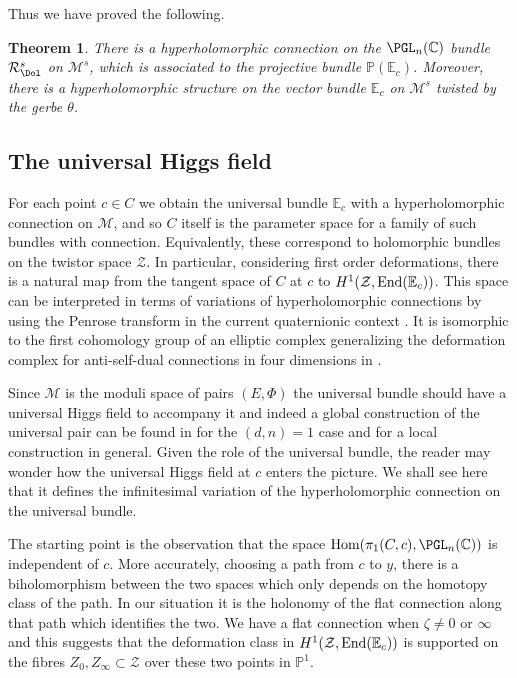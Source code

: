 \documentclass[12pt]{article}
\numberwithin{equation}{section}
\newtheorem{theorem}{Theorem}
\theoremstyle{remark}
\theoremstyle{definition}
\numberwithin{theorem}{section}
\DeclareMathOperator{\Hom}{Hom}
\def\E{\mathbb{E}}
\def\C{\mathbb{C}}
\def\M{{\mathcal{M}}}
\def\P{\mathbb{P}}
\newcommand{\calR}{\mathcal{R}}
\newcommand{\End}{\textnormal{End}}
\renewcommand{\1}{\mathbbm{1}}
\def\PP {\mathbb{P}}
\begin{document}




Thus we have proved the following.

\begin{theorem} There is a hyperholomorphic connection on the $\PGL_n(\C)$ bundle $\calR^s_\Dol$ on $\M^s$, which is associated to the projective bundle $\P(\E_c)$. Moreover, there is a hyperholomorphic structure on the  vector bundle $\E_c$ on $\M^s$ twisted by the gerbe  $\theta$. 	
\end{theorem}

\subsection{The universal Higgs field} 
For each point $c\in C$ we obtain the universal bundle $\E_c$ with a hyperholomorphic connection on ${\mathcal M}$, and so $C$ itself is the parameter space for  a family of such bundles with connection.  Equivalently, these correspond to holomorphic bundles on the twistor space ${\mathcal Z}$. In particular, considering first order deformations, there is a natural map from the tangent space of $C$ at $c$ to $H^1({\mathcal Z},\End (\E_c))$. This space can be interpreted  in terms of variations of hyperholomorphic connections  by using the Penrose transform in the current quaternionic context \cite{Sal}. It is isomorphic to the first cohomology group of an elliptic complex generalizing  the deformation complex for anti-self-dual connections in four dimensions in \cite{AHS}. 

Since $\M$ is the moduli space of pairs $(E,\Phi)$ the universal bundle should have a universal Higgs field to accompany it and indeed a global construction of the universal pair  can be found in  \cite{hausel-vanishing} for the $(d,n)=1$ case
and  \cite[Theorem 4.5]{simpson1}  for a local construction in general. 
Given the role of the universal bundle, the reader may wonder how the universal Higgs field at $c$ enters the picture. We shall see here that it defines the infinitesimal variation of the hyperholomorphic connection on the universal bundle.


The starting point is the observation that the space $\Hom(\pi_1(C,c), \PGL_n(\C))$ is independent of $c$. More accurately, choosing a path from $c$ to $y$, there is a biholomorphism between the two spaces which only depends on the homotopy class of the path. In our situation it is the holonomy of the flat connection along that path which identifies the two. We have a flat connection when $\zeta \ne 0$ or $\infty$ and this suggests that the deformation class in $H^1({\mathcal Z},\End (\E_c))$ is supported on the fibres $Z_0,Z_{\infty}\subset {\mathcal Z}$ over these two points in $\PP^1$.
\end{document}
